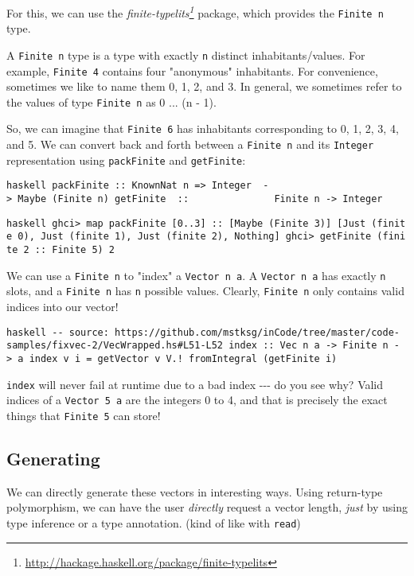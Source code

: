\documentclass[]{article}
\renewcommand{\href}[2]{#2\footnote{\url{#1}}}
\begin{document}
For this, we can use the
\emph{\href{http://hackage.haskell.org/package/finite-typelits}{finite-typelits}}
package, which provides the \texttt{Finite\ n} type.

A \texttt{Finite\ n} type is a type with exactly \texttt{n} distinct
inhabitants/values. For example, \texttt{Finite\ 4} contains four "anonymous"
inhabitants. For convenience, sometimes we like to name them 0, 1, 2, and 3. In
general, we sometimes refer to the values of type \texttt{Finite\ n} as 0 ... (n
- 1).

So, we can imagine that \texttt{Finite\ 6} has inhabitants corresponding to 0,
1, 2, 3, 4, and 5. We can convert back and forth between a \texttt{Finite\ n}
and its \texttt{Integer} representation using \texttt{packFinite} and
\texttt{getFinite}:

\texttt{haskell\ packFinite\ ::\ KnownNat\ n\ =\textgreater{}\ Integer\ \ -\textgreater{}\ Maybe\ (Finite\ n)\ getFinite\ \ ::\ \ \ \ \ \ \ \ \ \ \ \ \ \ \ Finite\ n\ -\textgreater{}\ Integer}

\texttt{haskell\ ghci\textgreater{}\ map\ packFinite\ {[}0..3{]}\ ::\ {[}Maybe\ (Finite\ 3){]}\ {[}Just\ (finite\ 0),\ Just\ (finite\ 1),\ Just\ (finite\ 2),\ Nothing{]}\ ghci\textgreater{}\ getFinite\ (finite\ 2\ ::\ Finite\ 5)\ 2}

We can use a \texttt{Finite\ n} to "index" a \texttt{Vector\ n\ a}. A
\texttt{Vector\ n\ a} has exactly \texttt{n} slots, and a \texttt{Finite\ n} has
\texttt{n} possible values. Clearly, \texttt{Finite\ n} only contains valid
indices into our vector!

\texttt{haskell\ -\/-\ source:\ https://github.com/mstksg/inCode/tree/master/code-samples/fixvec-2/VecWrapped.hs\#L51-L52\ index\ ::\ Vec\ n\ a\ -\textgreater{}\ Finite\ n\ -\textgreater{}\ a\ index\ v\ i\ =\ getVector\ v\ V.!\ fromIntegral\ (getFinite\ i)}

\texttt{index} will never fail at runtime due to a bad index -\/-\/- do you see
why? Valid indices of a \texttt{Vector\ 5\ a} are the integers 0 to 4, and that
is precisely the exact things that \texttt{Finite\ 5} can store!

\subsection{Generating}

We can directly generate these vectors in interesting ways. Using return-type
polymorphism, we can have the user \emph{directly} request a vector length,
\emph{just} by using type inference or a type annotation. (kind of like with
\texttt{read})
\end{document}
